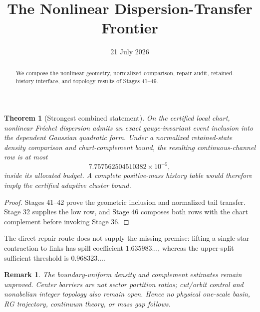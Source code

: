 \documentclass[11pt]{article}\usepackage[margin=1in]{geometry}\usepackage{amsmath,amsthm}\newtheorem{theorem}{Theorem}\newtheorem{remark}{Remark}
\title{The Nonlinear Dispersion-Transfer Frontier}\author{}\date{21 July 2026}
\begin{document}
\maketitle
\begin{abstract}We compose the nonlinear geometry, normalized comparison, repair audit, retained-history interface, and topology results of Stages 41--49.\end{abstract}
\begin{theorem}[Strongest combined statement]On the certified local chart, nonlinear Fr\'echet dispersion admits an exact gauge-invariant event inclusion into the dependent Gaussian quadratic form. Under a normalized retained-state density comparison and chart-complement bound, the resulting continuous-channel row is at most
\[7.757562504510382\times10^{-5},
\]
inside its allocated budget. A complete positive-mass history table would therefore imply the certified adaptive cluster bound.\end{theorem}
\begin{proof}Stages 41--42 prove the geometric inclusion and normalized tail transfer. Stage 32 supplies the low row, and Stage 46 composes both rows with the chart complement before invoking Stage 36.\end{proof}
The direct repair route does not supply the missing premise: lifting a single-star contraction to links has spill coefficient $1.635983\ldots$, whereas the upper-split sufficient threshold is $0.968323\ldots$.
\begin{remark}The boundary-uniform density and complement estimates remain unproved. Center barriers are not sector partition ratios; cut/orbit control and nonabelian integer topology also remain open. Hence no physical one-scale basin, RG trajectory, continuum theory, or mass gap follows.\end{remark}
\end{document}
